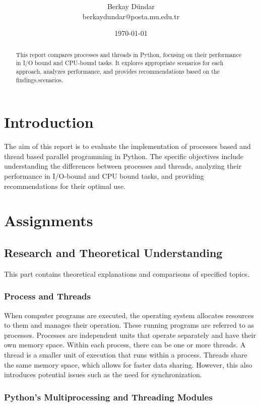 \documentclass[onecolumn]{article}
\title{\spacecaps{Assignment Report 1: Process and Thread Implementation}\\ \normalsize \spacesc{CENG 2034, OPERATING SYSTEMS} }
\author{Berkay Dündar\\berkaydundar@posta.mu.edu.tr}
\date{\today}
\begin{document}
\maketitle

\begin{abstract}
This report compares processes and threads in Python, focusing on their performance in I/O bound and CPU-bound tasks. It explores appropriate scenarios for each approach, analyzes performance, and
provides recommendations based on the findings.scenarios. 
\end{abstract}


\section{Introduction}
The aim of this report is to evaluate the implementation of processes based and thread based parallel programming in Python. The specific objectives include understanding the differences between processes and threads, analyzing their performance in I/O-bound and CPU bound tasks, and providing recommendations for their optimal use.

\section{Assignments}

\subsection{Research and Theoretical Understanding}

This part contains theoretical explanations and comparisons of specified topics.

\subsubsection{{Process and Threads}}

When computer programs are executed, the operating system allocates resources to them and manages their operation. These running programs are referred to as processes. Processes are independent units that operate separately and have their own memory space. Within each process, there can be one or more threads. A thread is a smaller unit of execution that runs within a process. Threads share the same memory space, which allows for faster data sharing. However, this also introduces potential issues such as the need for synchronization. 

\subsubsection{Python’s Multiprocessing and Threading Modules}
\end{document}
